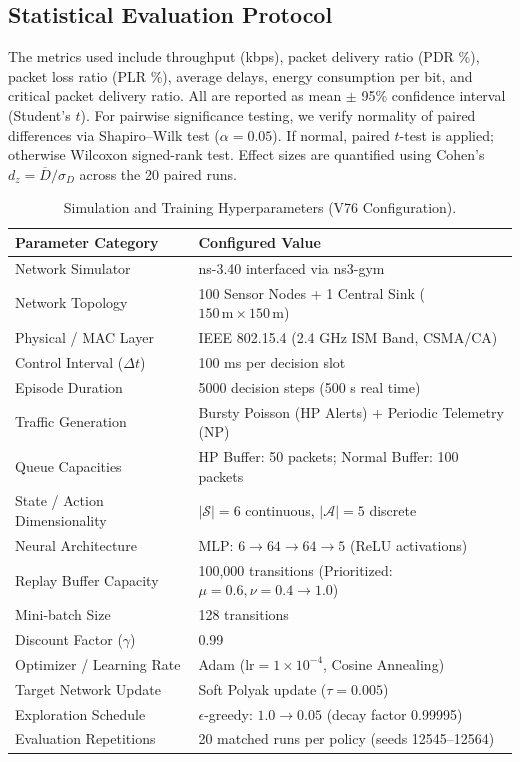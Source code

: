 \documentclass[runningheads]{llncs}
\begin{document}
\subsection{Statistical Evaluation Protocol}
The metrics used include throughput (kbps), packet delivery ratio (PDR \%), packet loss ratio (PLR \%), average delays, energy consumption per bit, and critical packet delivery ratio. All are reported as mean $\pm$ 95\% confidence interval (Student's $t$). For pairwise significance testing, we verify normality of paired differences via Shapiro--Wilk test ($\alpha=0.05$). If normal, paired $t$-test is applied; otherwise Wilcoxon signed-rank test. Effect sizes are quantified using Cohen's $d_z=\overline{D}/\sigma_D$ across the 20 paired runs.

\begin{table}[t]
\caption{Simulation and Training Hyperparameters (V76 Configuration).}
\label{tab:hyperparameters}
\centering
\small
\begin{tabular}{@{}p{}p{}@{}}
\toprule
\textbf{Parameter Category} & \textbf{Configured Value}\\
\midrule
Network Simulator & ns-3.40 interfaced via ns3-gym\\
Network Topology & 100 Sensor Nodes + 1 Central Sink ($150\,\mathrm{m}\times150\,\mathrm{m}$)\\
Physical / MAC Layer & IEEE 802.15.4 (2.4 GHz ISM Band, CSMA/CA)\\
Control Interval ($\Delta t$) & 100 ms per decision slot\\
Episode Duration & 5000 decision steps (500 s real time)\\
Traffic Generation & Bursty Poisson (HP Alerts) + Periodic Telemetry (NP)\\
Queue Capacities & HP Buffer: 50 packets; Normal Buffer: 100 packets\\
State / Action Dimensionality & $|\mathcal{S}|=6$ continuous, $|\mathcal{A}|=5$ discrete\\
Neural Architecture & MLP: $6\rightarrow64\rightarrow64\rightarrow5$ (ReLU activations)\\
Replay Buffer Capacity & 100,000 transitions (Prioritized: $\mu=0.6,\nu=0.4\rightarrow1.0$)\\
Mini-batch Size & 128 transitions\\
Discount Factor ($\gamma$) & 0.99\\
Optimizer / Learning Rate & Adam ($\mathrm{lr}=1\times10^{-4}$, Cosine Annealing)\\
Target Network Update & Soft Polyak update ($\tau=0.005$)\\
Exploration Schedule & $\epsilon$-greedy: $1.0\rightarrow0.05$ (decay factor 0.99995)\\
Evaluation Repetitions & 20 matched runs per policy (seeds 12545--12564)\\
\bottomrule
\end{tabular}
\end{table}
\end{document}
